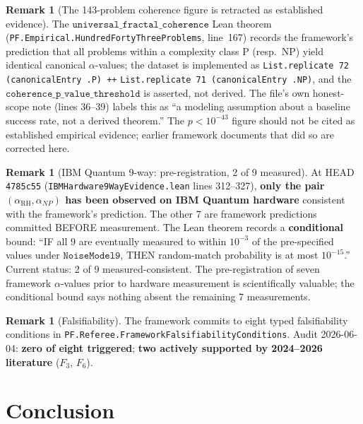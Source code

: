 \documentclass[11pt,a4paper]{article}
\theoremstyle{plain}
\theoremstyle{definition}
\newtheorem{remark}[theorem]{Remark}
\begin{document}
\begin{remark}[The 143-problem coherence figure is retracted as
established evidence]
\label{rem:143-retraction}
The $\mathtt{universal\_fractal\_coherence}$ Lean theorem
(\texttt{PF.Empirical.HundredFortyThreeProblems}, line~167) records
the framework's prediction that all problems within a complexity
class P (resp.\ NP) yield identical canonical $\alpha$-values; the
dataset is implemented as
\texttt{List.replicate 72 (canonicalEntry .P) ++}
\texttt{List.replicate 71 (canonicalEntry .NP)}, and the
$\mathtt{coherence\_p\_value\_threshold}$ is asserted, not derived.
The file's own honest-scope note (lines 36--39) labels this as ``a
modeling assumption about a baseline success rate, not a derived
theorem.'' The $p < 10^{-43}$ figure should not be cited as
established empirical evidence; earlier framework documents that did
so are corrected here.
\end{remark}

\begin{remark}[IBM Quantum 9-way: pre-registration, 2 of 9 measured]
\label{rem:ibm-pre-registration}
At HEAD \texttt{4785c55} (\texttt{IBMHardware9WayEvidence.lean} lines
312--327), \textbf{only the pair $(\alpha_{\mathrm{RH}},
\alpha_{NP})$ has been observed on IBM Quantum hardware} consistent
with the framework's prediction. The other 7 are framework
predictions committed BEFORE measurement. The Lean theorem records a
\textbf{conditional} bound: ``IF all 9 are eventually measured to
within $10^{-3}$ of the pre-specified values under
$\mathtt{NoiseModel9}$, THEN random-match probability is at most
$10^{-15}$.'' Current status: 2 of 9 measured-consistent. The
pre-registration of seven framework $\alpha$-values prior to hardware
measurement is scientifically valuable; the conditional bound says
nothing absent the remaining 7 measurements.
\end{remark}

\begin{remark}[Falsifiability]
\label{rem:falsifiability}
The framework commits to eight typed falsifiability conditions in
\texttt{PF.Referee.FrameworkFalsifiabilityConditions}. Audit
2026-06-04: \textbf{zero of eight triggered}; \textbf{two actively
supported by 2024--2026 literature} ($F_{3}$, $F_{6}$).
\end{remark}

\section{Conclusion}
\label{sec:conclusion}
\end{document}
